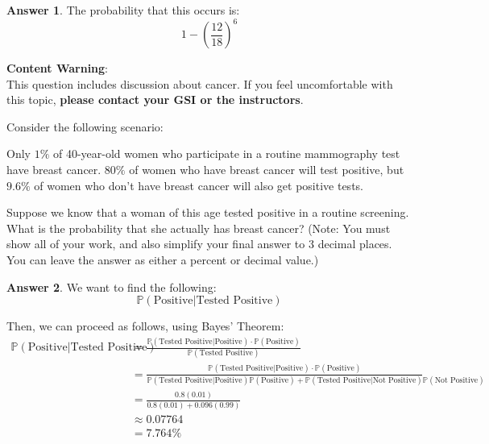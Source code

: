 \documentclass[addpoints, 12pt]{exam}
\theoremstyle{definition}
\newtheorem*{answer}{Answer}
\begin{document}
\begin{questions}
\begin{parts}
\begin{shaded}
\begin{answer}

The probability that this occurs is:
\begin{equation*}
	1 - \left( \frac{12}{18}\right)^{6}
\end{equation*}

\end{answer}
\end{shaded}
\end{parts}
\newpage

\textbf{Content Warning}: \\
This question includes discussion about cancer. If you feel uncomfortable with this topic, \textbf{please contact your GSI or the instructors}.

\question[3] Consider the following scenario:

Only $1\%$ of 40-year-old women who participate in a routine mammography test have breast cancer. $80\%$ of women who have breast cancer will test positive, but $9.6\%$ of women who don’t have breast cancer will also get positive tests. 

\vspace{.1in}

Suppose we know that a woman of this age tested positive in a routine screening. What is the probability that she actually has breast cancer? (Note: You must show all of your work, and also simplify your final answer to 3 decimal places. You can leave the answer as either a percent or decimal value.)


\vspace{.1in}

\begin{shaded}
\begin{answer}

We want to find the following:
\begin{equation*}
	\mathbb{P}(\text{Positive} | \text{Tested Positive})
\end{equation*}

Then, we can proceed as follows, using Bayes' Theorem:
\begin{align*}
	\mathbb{P}(\text{Positive} | \text{Tested Positive}) &= \frac{\mathbb{P}(\text{Tested Positive} | \text{Positive}) \cdot \mathbb P(\text{Positive})}{\mathbb{P}(\text{Tested Positive})} \\
	&= \frac{\mathbb{P}(\text{Tested Positive} | \text{Positive}) \cdot \mathbb P(\text{Positive})}{\mathbb{P}(\text{Tested Positive}|\text{Positive})\mathbb{P}(\text{Positive}) + \mathbb{P}(\text{Tested Positive} | \text{Not Positive})\mathbb{P}(\text{Not Positive})} \\
	&= \frac{0.8(0.01)}{0.8(0.01) + 0.096(0.99)} \\
	&\approx 0.07764 \\
	&= 7.764\%
\end{align*}


\end{answer}
\end{shaded}
\end{questions}
\end{document}
